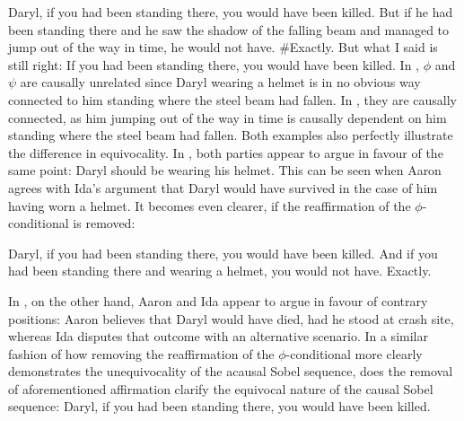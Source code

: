 			\a	{}Daryl, if you had been standing there, you would have been killed.
			\a	{}But if he had been standing there and he saw the shadow of the falling beam and managed to jump out of the way in time, he would not have.
			\a	{}\#Exactly. But what I said is still right:  If you had been
standing there, you would have been killed.\hfill\parencite[adapted from][p. 153f]{Klecha2014}
\xe
In , $\phi$ and $\psi$ are causally unrelated since Daryl wearing a helmet is in no obvious way connected to him standing where the steel beam had fallen. In , they are causally connected, as him jumping out of the way in time is causally dependent on him standing where the steel beam had fallen. Both examples also perfectly illustrate the difference in equivocality. In , both parties appear to argue in favour of the same point: Daryl should be wearing his helmet. This can be seen when Aaron agrees with Ida's argument that Daryl would have survived in the case of him having worn a helmet. It becomes even clearer, if the reaffirmation of the $\phi$-conditional is removed:\\\begin{minipage}{\linewidth}
\pex{}%
			\a	{}Daryl, if you had been standing there, you would have been killed.
			\a	{}And if you had been standing there and wearing a helmet, you would not have.
			\a	{}Exactly.\hfill\parencite[p. 150]{Klecha2015}
\xe\end{minipage}
In , on the other hand, Aaron and Ida appear to argue in favour of contrary positions: Aaron believes that Daryl would have died, had he stood at crash site, whereas Ida disputes that outcome with an alternative scenario. In a similar fashion of how removing the reaffirmation of the $\phi$-conditional more clearly demonstrates the unequivocality of the acausal Sobel sequence, does the removal of aforementioned affirmation clarify the equivocal nature of the causal Sobel sequence:
\pex{}%
			\a	{}Daryl, if you had been standing there, you would have been killed.
